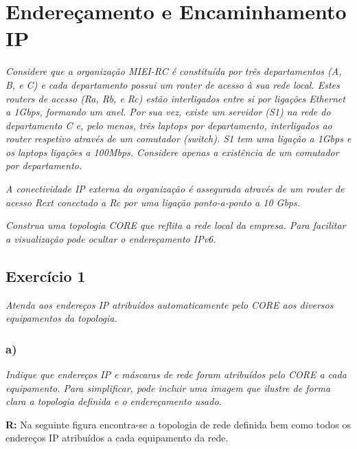 \documentclass{llncs}
\begin{document}
\section{Endereçamento e Encaminhamento IP}
\emph{Considere que a organização MIEI-RC é constituída por três departamentos (A, B, e C) e cada departamento possui um router de acesso à sua rede local. Estes routers de acesso (Ra, Rb, e Rc) estão interligados entre si por ligações Ethernet a 1Gbps, formando um anel. Por sua vez, existe um servidor (S1) na rede do departamento C e, pelo menos, três laptops por departamento, interligados ao router respetivo através de um comutador (switch). S1 tem uma ligação a 1Gbps e os laptops ligações a 100Mbps. Considere apenas a existência de um comutador por departamento.}

\emph{A conectividade IP externa da organização é assegurada através de um router de acesso Rext conectado a Rc por uma ligação ponto-a-ponto a 10 Gbps.}

\emph{Construa  uma  topologia  CORE que reflita a rede local da  empresa. Para  facilitar  a visualização pode ocultar o endereçamento IPv6.}

\subsection{Exercício 1}
\emph{Atenda aos endereços IP atribuídos automaticamente pelo CORE aos diversos equipamentos da topologia.}

\subsubsection{a)}
\emph{Indique que endereços IP e máscaras de rede foram atribuídos pelo CORE a cada equipamento. Para simplificar, pode incluir uma imagem que ilustre de forma clara a topologia definida e o endereçamento usado.}
\\ \par
\textbf{R:} Na seguinte figura encontra-se a topologia de rede definida bem como todos os endereços IP atribuídos a cada equipamento da rede.
\end{document}
